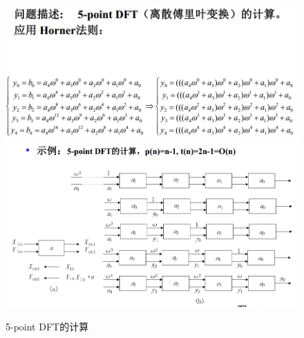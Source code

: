 \documentclass[UTF8,a4paper]{ctexart}
\begin{document}
  \begin{figure}[H]
    \centering
    \includegraphics[scale = 0.3]{assets/ParallelComputing_1adbb.png}
    \includegraphics[scale = 0.3]{assets/ParallelComputing_6426f.png}
    \caption{5-point DFT的计算}
  \end{figure}
\end{document}

